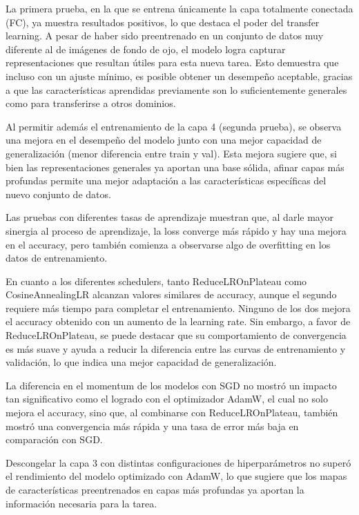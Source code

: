 La primera prueba, en la que se entrena únicamente la capa totalmente conectada (FC), ya muestra resultados positivos, lo que destaca el poder del transfer learning. A pesar de haber sido preentrenado en un conjunto de datos muy diferente al de imágenes de fondo de ojo, el modelo logra capturar representaciones que resultan útiles para esta nueva tarea. Esto demuestra que incluso con un ajuste mínimo, es posible obtener un desempeño aceptable, gracias a que las características aprendidas previamente son lo suficientemente generales como para transferirse a otros dominios.

Al permitir además el entrenamiento de la capa 4 (segunda prueba), se observa una mejora en el desempeño del modelo junto con una mejor capacidad de generalización (menor diferencia entre train y val). Esta mejora sugiere que, si bien las representaciones generales ya aportan una base sólida, afinar capas más profundas permite una mejor adaptación a las características específicas del nuevo conjunto de datos.

Las pruebas con diferentes tasas de aprendizaje muestran que, al darle mayor sinergia al proceso de aprendizaje, la loss converge más rápido y hay una mejora en el accuracy, pero también comienza a observarse algo de overfitting en los datos de entrenamiento.

En cuanto a los diferentes schedulers, tanto ReduceLROnPlateau como CosineAnnealingLR alcanzan valores similares de accuracy, aunque el segundo requiere más tiempo para completar el entrenamiento. Ninguno de los dos mejora el accuracy obtenido con un aumento de la learning rate. Sin embargo, a favor de ReduceLROnPlateau, se puede destacar que su comportamiento de convergencia es más suave y ayuda a reducir la diferencia entre las curvas de entrenamiento y validación, lo que indica una mejor capacidad de generalización.

La diferencia en el momentum de los modelos con SGD no mostró un impacto tan significativo como el logrado con el optimizador AdamW, el cual no solo mejora el accuracy, sino que, al combinarse con ReduceLROnPlateau, también mostró una convergencia más rápida y una tasa de error más baja en comparación con SGD.

Descongelar la capa 3 con distintas configuraciones de hiperparámetros no superó el rendimiento del modelo optimizado con AdamW, lo que sugiere que los mapas de características preentrenados en capas más profundas ya aportan la información necesaria para la tarea.

